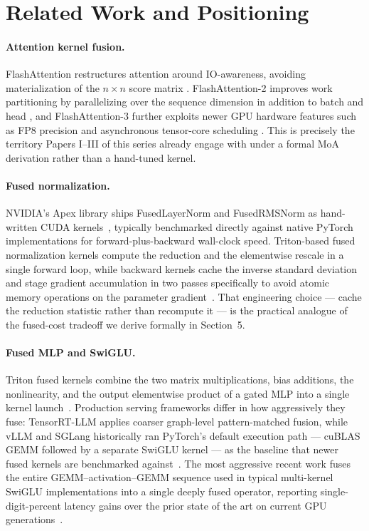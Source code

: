 \documentclass[11pt]{article}
\theoremstyle{definition}
\begin{document}
\section{Related Work and Positioning}

\paragraph{Attention kernel fusion.} FlashAttention restructures attention
around IO-awareness, avoiding materialization of the $n\times n$ score
matrix \citep{dao2022flashattention}. FlashAttention-2 improves work
partitioning by parallelizing over the sequence dimension in addition
to batch and head \citep{dao2023flashattention2}, and FlashAttention-3
further exploits newer GPU hardware features such as FP8 precision and
asynchronous tensor-core scheduling \citep{shah2024flashattention3}.
This is precisely the territory Papers I--III of this series already
engage with under a formal MoA derivation rather than a hand-tuned
kernel.

\paragraph{Fused normalization.} NVIDIA's Apex library ships
FusedLayerNorm and FusedRMSNorm as hand-written CUDA
kernels~\citep{nvidia2019apex}, typically benchmarked directly against
native PyTorch implementations for forward-plus-backward wall-clock
speed. Triton-based fused normalization kernels compute the reduction
and the elementwise rescale in a single forward loop, while backward
kernels cache the inverse standard deviation and stage gradient
accumulation in two passes specifically to avoid atomic memory
operations on the parameter gradient~\citep{emergentmind2026fused}.
That engineering choice --- cache the reduction statistic rather than
recompute it --- is the practical analogue of the fused-cost tradeoff we
derive formally in Section~5.

\paragraph{Fused MLP and SwiGLU.} Triton fused kernels combine the two
matrix multiplications, bias additions, the nonlinearity, and the output
elementwise product of a gated MLP into a single kernel
launch~\citep{emergentmind2026fused}. Production serving frameworks
differ in how aggressively they fuse: TensorRT-LLM applies coarser
graph-level pattern-matched fusion, while vLLM and SGLang historically
ran PyTorch's default execution path --- cuBLAS GEMM followed by a
separate SwiGLU kernel --- as the baseline that newer fused kernels are
benchmarked against~\citep{tile2026activation}. The most aggressive
recent work fuses the entire GEMM--activation--GEMM sequence used in
typical multi-kernel SwiGLU implementations into a single deeply fused
operator, reporting single-digit-percent latency gains over the prior
state of the art on current GPU generations~\citep{deepfusion2026kernel}.
\end{document}
